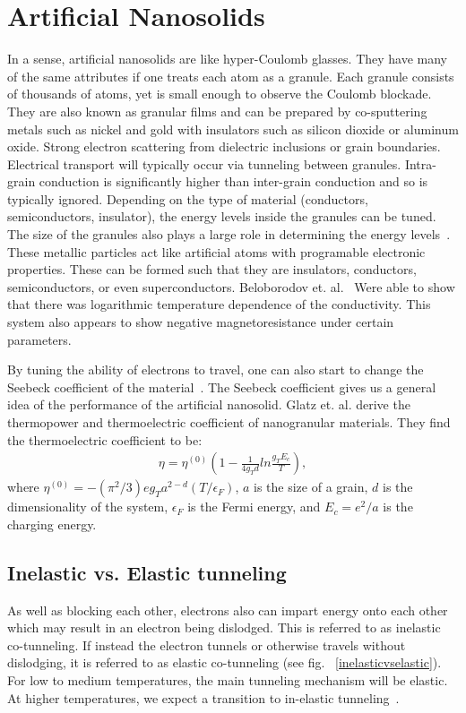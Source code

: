 \section{Artificial Nanosolids}

In a sense, artificial nanosolids are like hyper-Coulomb glasses. They have many of the same attributes if one treats each atom as a granule. Each granule consists of thousands of atoms, yet is small enough to observe the Coulomb blockade. They are also known as granular films and can be prepared by co-sputtering metals such as nickel and gold with insulators such as silicon dioxide or aluminum oxide. Strong electron scattering from dielectric inclusions or grain boundaries. Electrical transport will typically occur via tunneling between granules. Intra-grain conduction is significantly higher than inter-grain conduction and so is typically ignored. Depending on the type of material (conductors, semiconductors, insulator), the energy levels inside the granules can be tuned. The size of the granules also plays a large role in determining the energy levels~\cite{Abeles75}.  These metallic particles act like artificial atoms with programable electronic properties. These can be formed such that they are insulators, conductors, semiconductors, or even superconductors. Beloborodov et. al.~\cite{Beloborodov07}  Were able to show that there was logarithmic temperature dependence of the conductivity. This system also appears to show negative magnetoresistance under certain parameters. 

By tuning the ability of electrons to travel, one can also start to change the Seebeck coefficient of the material~\cite{Glatz09}. The Seebeck coefficient gives us a general idea of the performance of the artificial nanosolid. Glatz et. al. derive the thermopower and thermoelectric coefficient of nanogranular materials. They find the thermoelectric coefficient to be:
\begin{eqnarray}
\eta = \eta^{(0)} (1 - \frac{1} {4 g_T d} ln \frac{g_T E_c} {T} ),
\label{thermoelectric}
\end{eqnarray}
where $\eta^{(0)} = -(\pi^2 / 3) e g_T a^{2-d} (T/ \epsilon_F)$, $a$ is the size of a grain, $d$ is the dimensionality of the system, $\epsilon_F$ is the Fermi energy, and $E_c = e^2 /a$ is the charging energy.

\subsection{Inelastic vs. Elastic tunneling}
As well as blocking each other, electrons also can impart energy onto each other which may result in an electron being dislodged. This is referred to as inelastic co-tunneling. If instead the electron tunnels or otherwise travels without dislodging, it is referred to as elastic co-tunneling (see fig. ~\ref{inelasticvselastic}). For low to medium temperatures, the main tunneling mechanism will be elastic. At higher temperatures, we expect a transition to in-elastic tunneling~\cite{Glazman05}.

